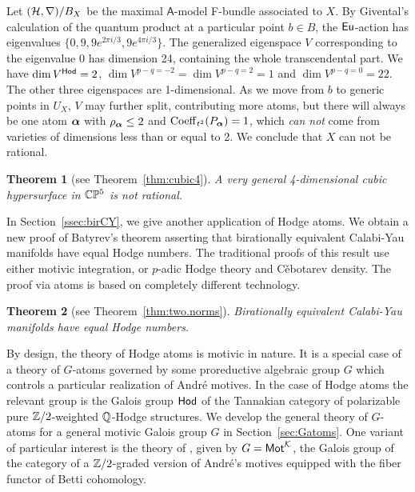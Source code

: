 \documentclass[twoside,leqno]{article}
\numberwithin{equation}{section}
\theoremstyle{plain}
\newtheorem*{theorem*}{Theorem}
\theoremstyle{definition}
\begin{document}
Let $(\mathcal H,\nabla)/B_{X}$ be the maximal $\mathsf{A}$-model F-bundle associated to $X$.
By Givental's calculation \cite{Givental_Homological_geometry_and_mirror_symmetry} of the quantum product at a particular point $b\in B$, the $\operatorname{\mathsf{Eu}}$-action has eigenvalues $\{0, 9, 9 e^{2\pi i/3}, 9 e^{4\pi i/3}\}$.
The generalized eigenspace $V$ corresponding to the eigenvalue 0 has dimension 24, containing the whole transcendental part.
We have $\dim V^{\mathsf{Hod}} = 2$, $\dim V^{p-q=-2}=\dim V^{p-q=2}=1$ and $\dim V^{p-q=0}=22$.
The other three eigenspaces are 1-dimensional.
As we move from $b$ to generic points in $U_X$, $V$ may further split, contributing more atoms,  but there will always be one atom $\boldsymbol{\alpha}$ with $\rho_{\boldsymbol{\alpha}} \le 2$ and $\operatorname{Coeff}_{t^2}(P_{\boldsymbol{\alpha}}) = 1$, which \emph{can not} come from varieties of dimensions less than or equal to 2.
We conclude that $X$ can not be rational. 

\begin{theorem*}[see Theorem~\ref{thm:cubic4}]
A very general 4-dimensional cubic hypersurface in $\mathbb C\mathbb P^5$ is not rational.
\end{theorem*}

In Section~\ref{ssec:birCY}, we give another application of Hodge atoms.
We obtain a new proof of Batyrev's theorem \cite[Corollary~6.29]{Batyrev-StringyHodge} asserting that birationally equivalent Calabi-Yau manifolds have equal Hodge numbers.
The traditional proofs of this result \cite{Batyrev-StringyHodge,Wang-Kequivalence,Ito} use either motivic integration, or $p$-adic Hodge theory and C\v{e}botarev density. The proof via atoms is based on completely different technology.

\begin{theorem*}[see Theorem~\ref{thm:two.norms}]
Birationally equivalent Calabi-Yau manifolds have equal Hodge numbers.   
\end{theorem*}

By design, the theory of Hodge atoms is motivic in nature. It is a special case of a theory of $G$-atoms governed by some proreductive algebraic group $G$ which controls a particular realization of Andr\'{e} motives.  In the case of Hodge atoms the relevant group is the  Galois group $\mathsf{Hod}$ of the Tannakian category of polarizable pure $\mathbb Z/2$-weighted $\mathbb Q$-Hodge structures. 
We develop the general theory of $G$-atoms for a general motivic Galois group $G$ in Section~\ref{sec:Gatoms}.
One variant of particular interest is the theory of , given by $G=\mathsf{Mot}^{\mathcal K}$, the Galois group of the category of a $\mathbb Z/2$-graded version of André's motives \cite{Andre_Pour_une_theorie_inconditionnelle_des_motifs} equipped with the fiber functor of Betti cohomology.
\end{document}
